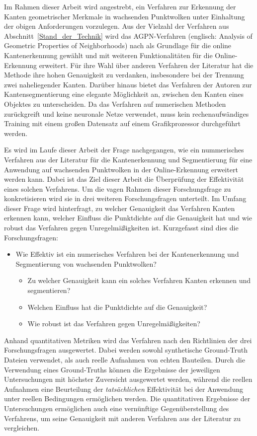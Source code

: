 Im Rahmen dieser Arbeit wird angestrebt, ein Verfahren zur Erkennung der Kanten geometrischer Merkmale in wachsenden Punktwolken unter Einhaltung der obigen Anforderungen vorzulegen. Aus der Vielzahl der Verfahren aus Abschnitt~\ref{Stand_der_Technik} wird das AGPN-Verfahren (englisch: Analysis of Geometric Properties of Neighborhoods) nach \textcite{ni_edge_2016} als Grundlage für die online Kantenerkennung gewählt und mit weiteren Funktionalitäten für die Online-Erkennung erweitert. Für ihre Wahl über anderen Verfahren der Literatur hat die Methode ihre hohen Genauigkeit zu verdanken, insbesondere bei der Trennung zwei naheliegender Kanten. Darüber hinaus bietet das Verfahren der Autoren zur Kantensegmentierung eine elegante Möglichkeit an, zwischen den Kanten eines Objektes zu unterscheiden. Da das Verfahren auf numerischen Methoden zurückgreift und keine neuronale Netze verwendet, muss kein rechenaufwändiges Training mit einem großen Datensatz auf einem Grafikprozessor durchgeführt werden.  

Es wird im Laufe dieser Arbeit der Frage nachgegangen, wie ein nummerisches Verfahren aus der Literatur für die Kantenerkennung und Segmentierung für eine Anwendung auf wachsenden Punktwolken in der Online-Erkennung erweitert werden kann. Dabei ist das Ziel dieser Arbeit die Überprüfung der Effektivität eines solchen Verfahrens. Um die vagen Rahmen dieser Forschungsfrage zu konkretisieren wird sie in drei weiteren Forschungsfragen unterteilt. Im Umfang dieser Frage wird hinterfragt, zu welcher Genauigkeit das Verfahren Kanten erkennen kann, welcher Einfluss die Punktdichte auf die Genauigkeit hat und wie robust das Verfahren gegen Unregelmäßigkeiten ist. Kurzgefasst sind dies die Forschungsfragen:

\begin{itemize}
	\item Wie Effektiv ist ein numerisches Verfahren bei der Kantenerkennung und Segmentierung von wachsenden Punktwolken?
	\begin{itemize}
		\item Zu welcher Genauigkeit kann ein solches Verfahren Kanten erkennen und segmentieren?
		\item Welchen Einfluss hat die Punktdichte auf die Genauigkeit?
		\item Wie robust ist das Verfahren gegen Unregelmäßigkeiten?
	\end{itemize}
\end{itemize}

Anhand quantitativen Metriken wird das Verfahren nach den Richtlinien der drei Forschungsfragen ausgewertet. Dabei werden sowohl synthetische Ground-Truth Dateien verwendet, als auch reelle Aufnahmen von echten Bauteilen. Durch die Verwendung eines Ground-Truths können die Ergebnisse der jeweiligen Untersuchungen mit höchster Zuversicht ausgewertet werden, während die reellen Aufnahmen eine Beurteilung der \textit{tatsächlichen} Effektivität bei der Anwendung unter reellen Bedingungen ermöglichen werden. Die quantitativen Ergebnisse der Untersuchungen ermöglichen auch eine vernünftige Gegenüberstellung des Verfahrens, um seine Genauigkeit mit anderen Verfahren aus der Literatur zu vergleichen. 

